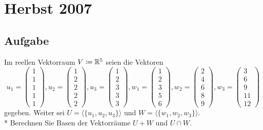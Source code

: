 \newpage


\section{Herbst 2007}

\subsection{Aufgabe}
Im reellen Vektorraum \( V \coloneqq \mathbb{R}^5 \) seien die Vektoren
\begin{equation*}
	u_1 = \begin{pmatrix}
		1 \\ 1 \\ 1 \\ 1 \\ 1
	\end{pmatrix},
	u_2 = \begin{pmatrix}
		1 \\ 2 \\ 2 \\ 2 \\ 2
	\end{pmatrix},
	u_3 = \begin{pmatrix}
		1 \\ 2 \\ 3 \\ 3 \\ 3
	\end{pmatrix},
	w_1 = \begin{pmatrix}
		1 \\ 2 \\ 3 \\ 5 \\ 6
	\end{pmatrix},
	w_2 = \begin{pmatrix}
		2 \\ 4 \\ 6 \\ 8 \\ 9
	\end{pmatrix},
	w_3 = \begin{pmatrix}
		3 \\ 6 \\ 9 \\ 11 \\ 12
	\end{pmatrix}
\end{equation*}
gegeben. Weiter sei \( U = \langle \{ u_1, u_2, u_3 \} \rangle \) und \( W = \langle \{ w_1, w_2, w_3 \} \rangle \). \\*
Berechnen Sie Basen der Vektorräume \( U+W \) und \( U \cap W \).

